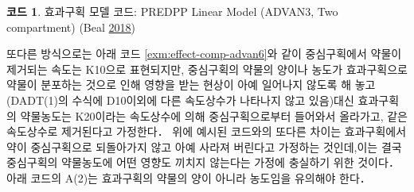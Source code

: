 \documentclass[
  10pt,
  krantz2,
  a4paper]{krantz}
\theoremstyle{definition}
\theoremstyle{definition}
\newtheorem{example}{코드}[chapter]
\theoremstyle{definition}
\theoremstyle{remark}
\begin{document}
\begin{example}
\protect\hypertarget{exm:effect-model-code}{}{\label{exm:effect-model-code} }효과구획 모델 코드: PREDPP Linear Model (ADVAN3, Two compartment) (Beal \protect\hyperlink{ref-nonmem}{2018})
\end{example}



또다른 방식으로는 아래 코드 \ref{exm:effect-comp-advan6}와 같이 중심구획에서 약물이 제거되는 속도는 K10으로 표현되지만, 중심구획의 약물의 양이나 농도가 효과구획으로 약물이 분포하는 것으로 인해 영향을 받는 현상이 아예 일어나지 않도록 해 놓고(DADT(1)의 수식에 D10이외에 다른 속도상수가 나타나지 않고 있음)대신 효과구획의 약물농도는 K20이라는 속도상수에 의해 중심구획으로부터 들어와서 올라가고, 같은 속도상수로 제거된다고 가정한다． 위에 예시된 코드와의 또다른 차이는 효과구획에서 약이 중심구획으로 되돌아가지 않고 아예 사라져 버린다고 가정하는 것인데,이는 결국 중심구획의 약물농도에 어떤 영향도 끼치지 않는다는 가정에 충실하기 위한 것이다． 아래 코드의 A(2)는 효과구획의 약물의 양이 아니라 농도임을 유의해야 한다．
\end{document}
